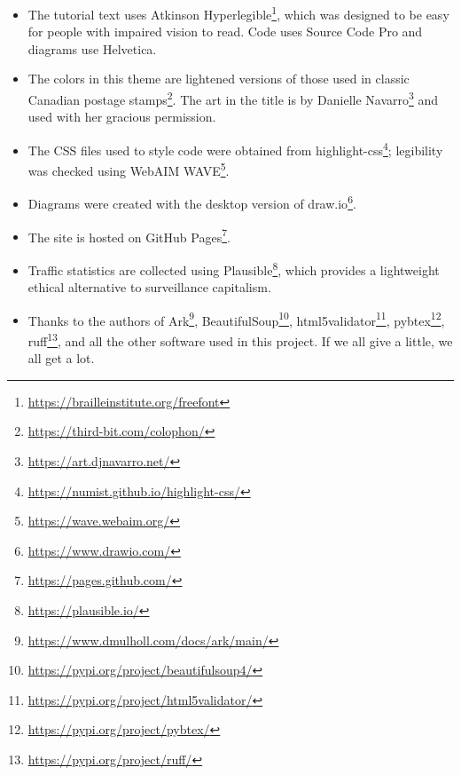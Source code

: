 \documentclass[krantzl]{krantz}
\newcommand{\hreffoot}[2]{{#1}\footnote{\href{#2}{#2}}}
\begin{document}
\begin{itemize}
\item 

The tutorial text uses \hreffoot{Atkinson Hyperlegible}{https://brailleinstitute.org/freefont},
    which was designed to be easy for people with impaired vision to read.
    Code uses Source Code Pro and diagrams use Helvetica.



\item 

The colors in this theme
    are lightened versions of those used in \hreffoot{classic Canadian postage stamps}{https://third-bit.com/colophon/}.
    The art in the title is by \hreffoot{Danielle Navarro}{https://art.djnavarro.net/}
    and used with her gracious permission.



\item 

The CSS files used to style code were obtained from \hreffoot{highlight-css}{https://numist.github.io/highlight-css/};
    legibility was checked using \hreffoot{WebAIM WAVE}{https://wave.webaim.org/}.



\item 

Diagrams were created with the desktop version of \hreffoot{draw.io}{https://www.drawio.com/}.



\item 

The site is hosted on \hreffoot{GitHub Pages}{https://pages.github.com/}.



\item 

Traffic statistics are collected using \hreffoot{Plausible}{https://plausible.io/},
    which provides a lightweight ethical alternative to surveillance capitalism.



\item 

Thanks to the authors of  \hreffoot{Ark}{https://www.dmulholl.com/docs/ark/main/},
    \hreffoot{BeautifulSoup}{https://pypi.org/project/beautifulsoup4/},
    \hreffoot{html5validator}{https://pypi.org/project/html5validator/},
    \hreffoot{pybtex}{https://pypi.org/project/pybtex/},
    \hreffoot{ruff}{https://pypi.org/project/ruff/},
    and all the other software used in this project.
    If we all give a little,
    we all get a lot.



\end{itemize}
\printindex
\end{document}
